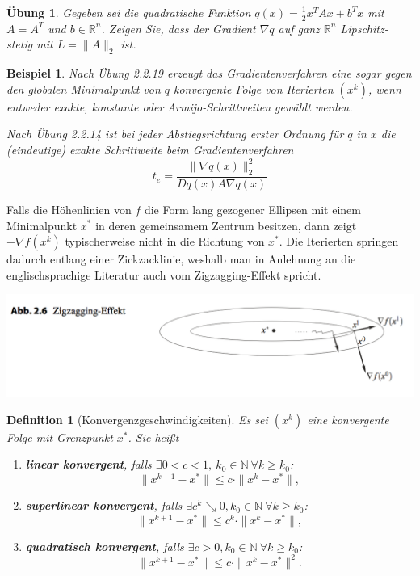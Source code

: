 \documentclass[11pt]{scrreprt}
\newcounter{thm}
\numberwithin{thm}{section}
\newtheorem{beispiel}[thm]{Beispiel}
\newtheorem{definition}[thm]{Definition}
\newtheorem{uebung}[thm]{Übung}
\begin{document}
\begin{uebung}
	Gegeben sei die quadratische Funktion $q(x) = \frac{1}{2} x^T A x + b^T x$ mit $A = A^T$ und $b \in \mathbb{R}^n$. Zeigen Sie, dass der Gradient $\nabla q$ auf ganz $\mathbb{R}^n$ Lipschitz-stetig mit $L = \| A \|_2$ ist. 
\end{uebung}

\begin{beispiel}
	Nach Übung 2.2.19 erzeugt das Gradientenverfahren eine sogar gegen den globalen Minimalpunkt von $q$ konvergente Folge von Iterierten $(x^k)$, wenn entweder exakte, konstante oder Armijo-Schrittweiten gewählt werden. ~\bigskip
	
	Nach Übung 2.2.14 ist bei jeder Abstiegsrichtung erster Ordnung für $q$ in $x$ die (eindeutige) exakte Schrittweite beim Gradientenverfahren 
	$$ t_e = \frac{\| \nabla q(x) \|_2^2}{D q(x) A \nabla q(x)} $$
\end{beispiel}

Falls die Höhenlinien von $f$ die Form lang gezogener Ellipsen mit einem Minimalpunkt $x^*$ in deren gemeinsamem Zentrum besitzen, dann zeigt $-\nabla f(x^k)$ typischerweise nicht in die Richtung von $x^*$. Die Iterierten springen dadurch entlang einer Zickzacklinie, weshalb man in Anlehnung an die englischsprachige Literatur auch vom Zigzagging-Effekt spricht.

\begin{center}
	\includegraphics[scale=0.5]{ab26}
\end{center}

\begin{definition}[Konvergenzgeschwindigkeiten]
	Es sei $(x^k)$ eine konvergente Folge mit Grenzpunkt $x^*$. Sie heißt
	\begin{enumerate}[label=\alph*\upshape)]
		\item \textbf{linear konvergent}, falls $\exists 0 < c < 1, ~ k_0 \in \mathbb{N} ~\forall k \geq k_0$: $$ \| x^{k+1} - x^*\| \leq c \cdot \| x^k - x^* \|, $$
		\item \textbf{superlinear konvergent}, falls $\exists c^k \searrow 0, k_0 \in \mathbb{N} ~\forall k \geq k_0$: $$ \| x^{k+1} - x^*\| \leq c^k \cdot \| x^k- x^* \|, $$
		\item \textbf{quadratisch konvergent}, falls $\exists c > 0, k_0 \in \mathbb{N} ~\forall k \geq k_0$: $$ \| x^{k+1} - x^* \| \leq c \cdot \| x^k - x^* \|^2. $$
	\end{enumerate}
\end{definition}
\end{document}
